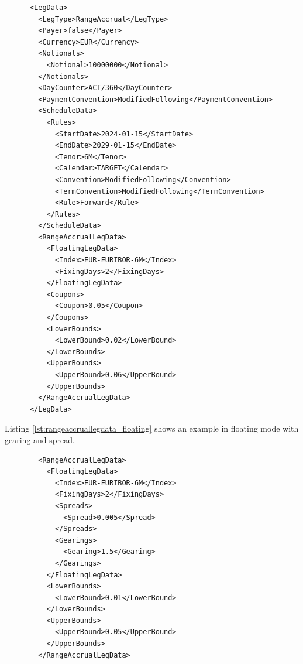 \begin{listing}[H]
\begin{verbatim}
      <LegData>
        <LegType>RangeAccrual</LegType>
        <Payer>false</Payer>
        <Currency>EUR</Currency>
        <Notionals>
          <Notional>10000000</Notional>
        </Notionals>
        <DayCounter>ACT/360</DayCounter>
        <PaymentConvention>ModifiedFollowing</PaymentConvention>
        <ScheduleData>
          <Rules>
            <StartDate>2024-01-15</StartDate>
            <EndDate>2029-01-15</EndDate>
            <Tenor>6M</Tenor>
            <Calendar>TARGET</Calendar>
            <Convention>ModifiedFollowing</Convention>
            <TermConvention>ModifiedFollowing</TermConvention>
            <Rule>Forward</Rule>
          </Rules>
        </ScheduleData>
        <RangeAccrualLegData>
          <FloatingLegData>
            <Index>EUR-EURIBOR-6M</Index>
            <FixingDays>2</FixingDays>
          </FloatingLegData>
          <Coupons>
            <Coupon>0.05</Coupon>
          </Coupons>
          <LowerBounds>
            <LowerBound>0.02</LowerBound>
          </LowerBounds>
          <UpperBounds>
            <UpperBound>0.06</UpperBound>
          </UpperBounds>
        </RangeAccrualLegData>
      </LegData>
\end{verbatim}
\caption{Range Accrual leg data (fixed-rate mode)}
\label{lst:rangeaccruallegdata}
\end{listing}

Listing \ref{lst:rangeaccruallegdata_floating} shows an example in floating mode with gearing and spread.

\begin{listing}[H]
\begin{verbatim}
        <RangeAccrualLegData>
          <FloatingLegData>
            <Index>EUR-EURIBOR-6M</Index>
            <FixingDays>2</FixingDays>
            <Spreads>
              <Spread>0.005</Spread>
            </Spreads>
            <Gearings>
              <Gearing>1.5</Gearing>
            </Gearings>
          </FloatingLegData>
          <LowerBounds>
            <LowerBound>0.01</LowerBound>
          </LowerBounds>
          <UpperBounds>
            <UpperBound>0.05</UpperBound>
          </UpperBounds>
        </RangeAccrualLegData>
\end{verbatim}
\caption{Range Accrual leg data (floating mode)}
\label{lst:rangeaccruallegdata_floating}
\end{listing}

